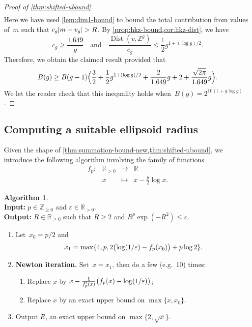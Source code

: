 \documentclass[12pt,oneside]{amsart}
\numberwithin{equation}{section}
\theoremstyle{definition}
\newtheorem{algorithm}[equation]{Algorithm}
\newcommand{\algoinput}[1]{~\\ \noindent\textbf{Input:} #1}
\newcommand{\algooutput}[1]{~\\ \noindent\textbf{Output:} #1}
\newcommand{\Z}{\mathbb{Z}}
\newcommand{\R}{\mathbb{R}}
\newcommand{\eps}{\varepsilon}
\DeclareMathOperator{\Dist}{Dist}
\DeclarePairedDelimiter{\abs}{|}{|}
\DeclarePairedDelimiter{\paren}{(}{)}
\DeclarePairedDelimiter{\braces}{\{}{\}}
\begin{document}
\begin{proof}[Proof of \cref{thm:shifted-ubound}]
\begin{align*}
  \end{align*}
  Here we have used \cref{lem:dim1-bound} to bound the total contribution from
  values of~$m$ such that $c_g\abs{m-v_g} > R$. By \cref{prop:hkz-bound,cor:hkz-dist}, we have
  \begin{displaymath}
    c_g \geq \frac{1.649}{g} \quad \text{and}\quad \frac{\Dist(v,\Z^g)}{c_g}\leq \frac12 g^{1+(\log g)/2}.
  \end{displaymath}
  Therefore, we obtain the claimed result provided that
  \begin{displaymath}
    B(g) \geq B(g-1) \paren[\Big]{\frac32 + \frac12 g^{1+(\log g)/2} + \frac{2}{1.649}g
      + 2 + \frac{\sqrt{2\pi}}{1.649}g}.
  \end{displaymath}
  We let the reader check that this inequality holds
  when~$B(g) = 2^{10(1+g\log g)}$.
\end{proof}

\subsection{Computing a suitable ellipsoid radius}
\label{subsec:compute-R}

Given the shape of \cref{thm:summation-bound-new,thm:shifted-ubound}, we
introduce the following algorithm involving the family of functions
\begin{equation}
  \label{eq:fun-f}
  \begin{matrix}
    f_p : & \R_{>0} &\to &\R \\
    & x & \mapsto & x - \frac p2 \log x.
  \end{matrix}
\end{equation}

\begin{algorithm}
  \label{algo:R}
  \algoinput{$p\in \Z_{\geq 0}$ and $\eps\in \R_{>0}$.}
  \algooutput{$R\in \R_{\geq 0}$ such that $R\geq 2$ and
    $R^p \exp(-R^2)\leq \eps$.}

  \begin{enumerate}
  \item \label{step:R-init} Let~$x_0 = p/2$ and
    \begin{displaymath}
      x_1 = \max\braces{4, p, 2 \paren[\big]{\log(1/\eps)-f_p(x_0)} + p\log 2}.
    \end{displaymath}
  \item \label{step:R-newton} \textbf{Newton iteration.} Set~$x = x_1$, then do
    a few (e.g.~10) times:
    \begin{enumerate}
    \item Replace $x$ by $ x - \frac{1}{f_p'(x)} \paren[\big]{f_p(x) - \log(1/\eps)}$;
    \item Replace $x$ by an exact upper bound on $\max\{x, x_0\}$.
    \end{enumerate}
  \item \label{step:R-final} Output $R$, an exact upper bound on
    $\max\{2,\sqrt{x}\}$.
  \end{enumerate}
\end{algorithm}
\end{document}
